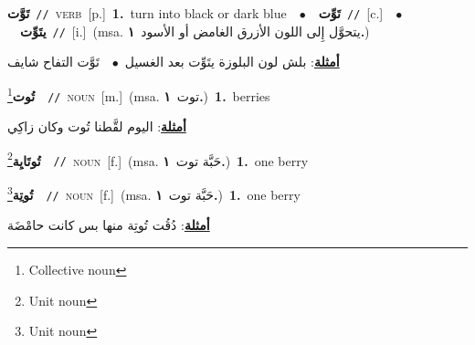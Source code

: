 \documentclass[10pt,a4paper,twoside]{article} %
\begin{document}
\begin{multicols}{2}
{\setlength\topsep{0pt}\textbf{\foreignlanguage{arabic}{تَوَّت}}\ {\color{gray}\texttt{//}\color{black}}\ \textsc{verb}\ [p.]\ \textbf{1.}~turn into black or dark blue\ \ $\bullet$\ \ \setlength\topsep{0pt}\textbf{\foreignlanguage{arabic}{تَوِّت}}\ {\color{gray}\texttt{//}\color{black}}\ [c.]\ \ $\bullet$\ \ \setlength\topsep{0pt}\textbf{\foreignlanguage{arabic}{يتَوِّت}}\ {\color{gray}\texttt{//}\color{black}}\ [i.]\ \color{gray}(msa. \foreignlanguage{arabic}{يتحوَّل إِلى اللون الأزرق الغامض أو الأسود}~\foreignlanguage{arabic}{\textbf{١.}})\color{black}\  \begin{flushright}\color{gray}\foreignlanguage{arabic}{\textbf{\underline{\foreignlanguage{arabic}{أمثلة}}}: بلش لون البلوزة يتَوِّت بعد الغسيل\ $\bullet$\ \  تَوَّت التفاح شايف}\end{flushright}\color{black}} \vspace{2mm}

{\setlength\topsep{0pt}\textbf{\foreignlanguage{arabic}{تُوت}}\footnote{Collective noun}\ \ {\color{gray}\texttt{//}\color{black}}\ \textsc{noun}\ [m.]\ \color{gray}(msa. \foreignlanguage{arabic}{توت}~\foreignlanguage{arabic}{\textbf{١.}})\color{black}\ \textbf{1.}~berries\  \begin{flushright}\color{gray}\foreignlanguage{arabic}{\textbf{\underline{\foreignlanguage{arabic}{أمثلة}}}: اليوم لقَّطنا تُوت وكان زاكِي}\end{flushright}\color{black}} \vspace{2mm}

{\setlength\topsep{0pt}\textbf{\foreignlanguage{arabic}{تُوتَايِة}}\footnote{Unit noun}\ \ {\color{gray}\texttt{//}\color{black}}\ \textsc{noun}\ [f.]\ \color{gray}(msa. \foreignlanguage{arabic}{حَبَّة توت}~\foreignlanguage{arabic}{\textbf{١.}})\color{black}\ \textbf{1.}~one berry\ } \vspace{2mm}

{\setlength\topsep{0pt}\textbf{\foreignlanguage{arabic}{تُوتِة}}\footnote{Unit noun}\ \ {\color{gray}\texttt{//}\color{black}}\ \textsc{noun}\ [f.]\ \color{gray}(msa. \foreignlanguage{arabic}{حَبَّة توت}~\foreignlanguage{arabic}{\textbf{١.}})\color{black}\ \textbf{1.}~one berry\  \begin{flushright}\color{gray}\foreignlanguage{arabic}{\textbf{\underline{\foreignlanguage{arabic}{أمثلة}}}: دُقُت تُوتِة منها بس كانت حامْضَة}\end{flushright}\color{black}} \vspace{2mm}


\end{multicols}
\end{document}
